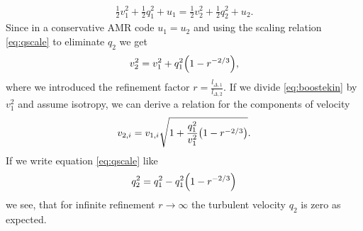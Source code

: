 \begin{align}
\frac{1}{2}v_1^2 + \frac{1}{2}q_1^2 + u_1 = 
\frac{1}{2}v_2^2 + \frac{1}{2}q_2^2 + u_2.
\end{align}
Since in a conservative AMR code $u_1 = u_2$ and using the scaling relation
\eqref{eq:qscale} to eliminate $q_2$ we get
\begin{align}
v_2^2=v_1^2+q_1^2 { \left( 1-r^{-2/3} \right) },\label{eq:boostekin}
\end{align}
where we introduced the refinement factor
$r=\frac{l_{\Delta,1}}{l_{\Delta,2}}$. 
If we divide \eqref{eq:boostekin} by $v_1^2$ and assume isotropy, we can derive
a relation for the components of velocity 
\begin{align}
v_{2,i}=v_{1,i} \sqrt{1+\frac{q_1^2}{v_1^2} { \left( 1-r^{-2/3} \right) }}.
\end{align}
If we write equation \eqref{eq:qscale} like
\begin{align}
q_2^2 = q_1^2 - q_1^2 { \left( 1-r^{-2/3} \right) }
\end{align}
we see, that for infinite refinement $r \rightarrow \infty$ the turbulent
velocity  $q_2$ is zero as expected. 

